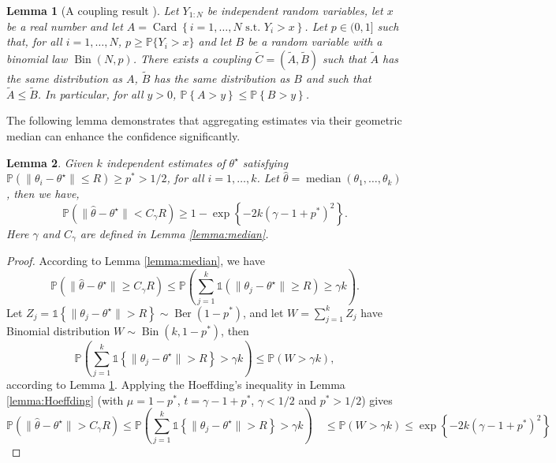\documentclass[11pt]{article}
\newtheorem{lemma}{Lemma}
\begin{document}
		\begin{lemma}[A coupling result \cite{lerasle2011robust}]
			\label{lemma:coupling}
			Let $ Y_{1:N} $ be independent random variables, let $ x $ be a real number and let $ A = \operatorname{Card}\left\{i=1,\ldots,N \text{ s.t. } Y_i >x\right\} $. Let $ p\in (0,1] $ such that, for all $ i=1,\ldots,N $, $ p \geq \mathbb{P}\{Y_i > x\} $ and let $ B $ be a random variable with a binomial law $ \operatorname{Bin}(N,p) $. There exists a coupling $ \tilde{C}=(\tilde{A},\tilde{B}) $ such that $ \tilde{A} $ has the same distribution as $ A $, $ \tilde{B} $ has the same distribution as $ B $ and such that $ \tilde{A}\leq \tilde{B} $. In particular, for all $ y>0 $,			$\mathbb{P}\left\{A>y\right\} \leq \mathbb{P}\left\{B>y\right\}$.
			\end{lemma}
			The following lemma demonstrates that aggregating estimates via their geometric median can enhance the confidence significantly. 
			\begin{lemma}
				\label{lemma:median_aggregation}
				Given $ k $ independent estimates of $ \theta^\star $ satisfying $ \mathbb{P}(\|{\theta}_i - \theta^\star \| \leq  R) \geq p^* >1/2 $, for all $ i=1,\ldots, k $. Let $ \widehat{\theta}= \operatorname{median}({\theta}_1,\ldots, {\theta}_k) $, then we have,
				\begin{equation*}
				\mathbb{P}\left(\|\widehat{\theta} - \theta^\star \| < C_\gamma R \right) \geq 1-\exp\left\{ -2k(\gamma-1+p^*)^2  \right\}.
				\end{equation*}
				Here $\gamma$ and $C_\gamma$ are defined in Lemma \ref{lemma:median}.
				\end{lemma}		
				\begin{proof}
					 According to Lemma \ref{lemma:median}, we have
					\begin{equation*}
					\mathbb{P}\left(\|\widehat{\theta} - \theta^\star \| \geq C_\gamma R \right) \leq \mathbb{P}\left(\sum_{j=1}^k \mathds{1}\left(\|{\theta}_j - \theta^\star\| \geq R \right) \geq \gamma k\right).
					\end{equation*}	
					Let $ Z_j =  \mathds{1}\left\{\|{\theta}_j - \theta^\star \| > R \right \} \sim \operatorname{Ber}(1-p^*)$, and let $ W=\sum_{j=1}^k Z_j$ have Binomial distribution $ W \sim \operatorname{Bin}(k,1-p^*) $, then
					\begin{equation*}
					\mathbb{P}\left(\sum_{j=1}^k \mathds{1}\left\{\|{\theta}_j - \theta^\star \| > R \right \} > \gamma k \right) \leq \mathbb{P}(W > \gamma k),
					\end{equation*}
					according to Lemma \ref{lemma:coupling}. Applying the Hoeffding's inequality in Lemma \ref{lemma:Hoeffding} (with $ \mu = 1-p^* $, $ t = \gamma - 1 + p^* $, $\gamma < 1/2$ and $ p^* > 1/2 $) gives
					\begin{equation*}
							\mathbb{P} \left( \|\widehat{\theta}- \theta^\star\| > C_\gamma R \right) \leq  \mathbb{P}\left(\sum_{j=1}^k \mathds{1}\left\{\|{\theta}_j - \theta^\star \| > R \right \} > \gamma k \right) 
						\quad \leq  \mathbb{P}\left(W  > \gamma k  \right) \leq \exp\left\{-2k (\gamma - 1+p^*)^2  \right\}
						\end{equation*}
						\end{proof}
						
\end{document}
